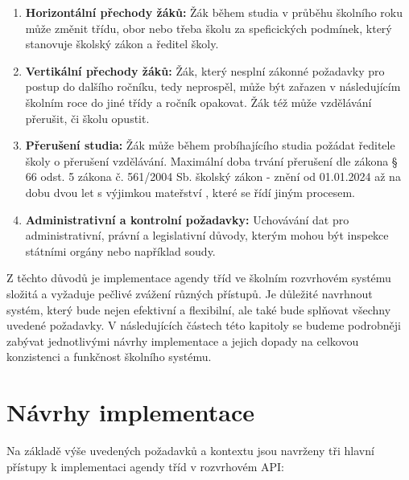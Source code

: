 \begin{enumerate}
    \item \textbf{Horizontální přechody žáků:} Žák během studia v průběhu školního roku může změnit třídu, obor nebo třeba školu za speficických podmínek, který stanovuje školský zákon a ředitel školy.
    \item \textbf{Vertikální přechody žáků:} Žák, který nesplní zákonné požadavky pro postup do dalšího ročníku, tedy neprospěl, může být zařazen v následujícím školním roce do jiné třídy a ročník opakovat. Žák též může vzdělávání přerušit, či školu opustit.
    \item \textbf{Přerušení studia:} Žák může během probíhajícího studia požádat ředitele školy o přerušení vzdělávání. Maximální doba trvání přerušení dle zákona § 66 odst. 5 zákona č. 561/2004 Sb. školský zákon - znění od 01.01.2024 \cite{skolsky-zakon-preruseni-obyc} až na dobu dvou let s výjimkou mateřství \cite{skolsky-zakon-preruseni-materstvi}, které se řídí jiným procesem.
    \item \textbf{Administrativní a kontrolní požadavky:} Uchovávání dat pro administrativní, právní a legislativní důvody, kterým mohou být inspekce státními orgány nebo například soudy.
\end{enumerate}

Z těchto důvodů je implementace agendy tříd ve školním rozvrhovém systému složitá a vyžaduje pečlivé zvážení různých přístupů. Je důležité navrhnout systém, který bude nejen efektivní a flexibilní, ale také bude splňovat všechny uvedené požadavky. V následujících částech této kapitoly se budeme podrobněji zabývat jednotlivými návrhy implementace a jejich dopady na celkovou konzistenci a funkčnost školního systému.

\section{Návrhy implementace}
Na základě výše uvedených požadavků a kontextu jsou navrženy tři hlavní přístupy k implementaci agendy tříd v rozvrhovém API:

